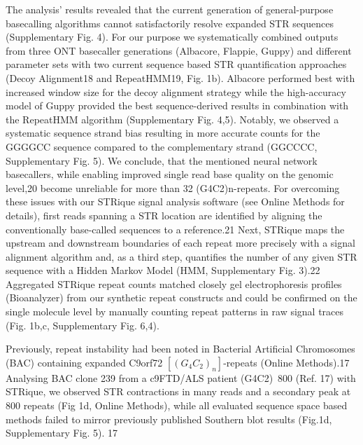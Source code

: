 The analysis’ results revealed that the current generation of general-purpose basecalling algorithms cannot satisfactorily resolve expanded STR sequences (Supplementary Fig. 4). For our purpose we systematically combined outputs from three ONT basecaller generations (Albacore, Flappie, Guppy) and different parameter sets with two current sequence based STR quantification approaches (Decoy Alignment18 and RepeatHMM19, Fig. 1b). Albacore performed best with increased window size for the decoy alignment strategy while the high-accuracy model of Guppy provided the best sequence-derived results in combination with the RepeatHMM algorithm (Supplementary Fig. 4,5). Notably, we observed a systematic sequence strand bias resulting in more accurate counts for the GGGGCC sequence compared to the complementary strand (GGCCCC, Supplementary Fig. 5). We conclude, that the mentioned neural network basecallers, while enabling improved single read base quality on the genomic level,20 become unreliable for more than 32 (G4C2)n-repeats.
For overcoming these issues with our STRique signal analysis software (see Online Methods for details), first reads spanning a STR location are identified by aligning the conventionally base-called sequences to a reference.21 Next, STRique maps the upstream and downstream boundaries of each repeat more precisely with a signal alignment algorithm and, as a third step, quantifies the number of any given STR sequence with a Hidden Markov Model (HMM, Supplementary Fig. 3).22 Aggregated STRique repeat counts matched closely gel electrophoresis profiles (Bioanalyzer) from our synthetic repeat constructs and could be confirmed on the single molecule level by manually counting repeat patterns in raw signal traces (Fig. 1b,c, Supplementary Fig. 6,4).


Previously, repeat instability had been noted in Bacterial Artificial Chromosomes (BAC) containing expanded C9orf72 $ [(G_{4}C_{2})_{n}] $-repeats (Online Methods).17 Analysing BAC clone 239 from a c9FTD/ALS patient (G4C2)~800 (Ref. 17) with STRique, we observed STR contractions in many reads and a secondary peak at 800 repeats (Fig 1d, Online Methods), while all evaluated sequence space based methods failed to mirror previously published Southern blot results (Fig.1d, Supplementary Fig. 5). 17


